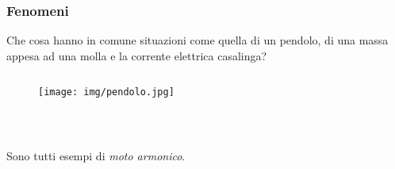 \documentclass[]{beamer}
\theoremstyle{plain}
\begin{document}
\begin{frame}
  \frametitle{Fenomeni}
  Che cosa hanno in comune situazioni come quella di un pendolo, di una massa appesa ad una molla e la corrente elettrica casalinga?
  \begin{columns}
    \begin{column}{0.3\textwidth}
      \begin{figure}
        \texttt{[image: img/pendolo.jpg]}
      \end{figure}
    \end{column}
    \begin{column}{0.3\textwidth}
    \end{column}
    \begin{column}{0.3\textwidth}
    \end{column}
  \end{columns}\pause
  \begin{center}
  ~
  \end{center}
  Sono tutti esempi di \emph{moto armonico}.
\end{frame}
\end{document}
